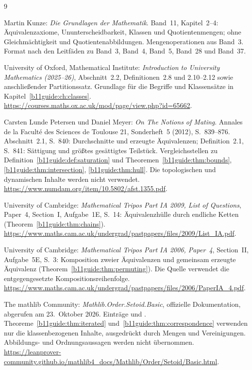 \renewcommand{\bibname}{Quellen und Bandzuordnung}
\begin{thebibliography}{9}
\footnotesize
\setlength{\itemsep}{4pt}
\setlength{\parskip}{0pt}

Martin Kunze: \emph{Die Grundlagen der Mathematik}.
Band~11, Kapitel~2--4: Äquivalenzaxiome, Ununterscheidbarkeit,
Klassen und Quotientenmengen; ohne Gleichmächtigkeit und
Quotientenabbildungen. Mengenoperationen aus Band~3.
Format nach den Leitfäden zu Band~3, Band~4, Band~5, Band~28 und Band~37.

University of Oxford, Mathematical Institute:
\emph{Introduction to University Mathematics (2025--26)},
Abschnitt~2.2, Definitionen~2.8 und 2.10--2.12 sowie anschließender
Partitionssatz. Grundlage für die Begriffe und Klassensätze in
Kapitel~\ref{b11guide:ch:classes}.
\url{https://courses.maths.ox.ac.uk/mod/page/view.php?id=65662}.

Carsten Lunde Petersen und Daniel Meyer:
\emph{On The Notions of Mating}.
Annales de la Faculté des Sciences de Toulouse 21, Sonderheft~5
(2012), S.~839--876.
Abschnitt~2.1, S.~840: Durchschnitte und erzeugte Äquivalenzen;
Definition~2.1, S.~841: Sättigung und größtes gesättigtes Teilstück.
Vergleichsstellen zu Definition~\ref{b11guide:def:saturation}
und Theoremen~\ref{b11guide:thm:bounds},
\ref{b11guide:thm:intersection}, \ref{b11guide:thm:hull}.
Die topologischen und dynamischen Inhalte werden nicht verwendet.
\url{https://www.numdam.org/item/10.5802/afst.1355.pdf}.

University of Cambridge: \emph{Mathematical Tripos Part IA 2009,
List of Questions}, Paper~4, Section~I, Aufgabe~1E, S.~14:
Äquivalenzhülle durch endliche Ketten
(Theorem~\ref{b11guide:thm:chains}).
\url{https://www.maths.cam.ac.uk/undergrad/pastpapers/files/2009/List_IA.pdf}.

University of Cambridge: \emph{Mathematical Tripos Part IA 2006,
Paper~4}, Section~II, Aufgabe~5E, S.~3:
Komposition zweier Äquivalenzen und gemeinsam erzeugte Äquivalenz
(Theorem~\ref{b11guide:thm:permuting}).
Die Quelle verwendet die entgegengesetzte Kompositionsreihenfolge.
\url{https://www.maths.cam.ac.uk/undergrad/pastpapers/files/2006/PaperIA_4.pdf}.

The mathlib Community: \emph{Mathlib.Order.Setoid.Basic},
offizielle Dokumentation, abgerufen am 23.~Oktober 2026.
Einträge 
und .
Theoreme~\ref{b11guide:thm:iterated}
und~\ref{b11guide:thm:correspondence} verwenden nur die
klassenbezogenen Inhalte, ausgedrückt durch Mengen und Vereinigungen.
Abbildungs- und Ordnungsaussagen werden nicht übernommen.
\url{https://leanprover-community.github.io/mathlib4_docs/Mathlib/Order/Setoid/Basic.html}.

\end{thebibliography}

